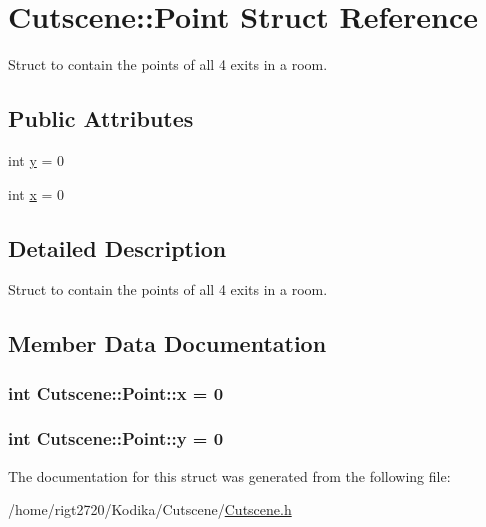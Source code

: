 \hypertarget{structCutscene_1_1Point}{\section{Cutscene\-:\-:Point Struct Reference}
\label{structCutscene_1_1Point}
}


Struct to contain the points of all 4 exits in a room.  


\subsection*{Public Attributes}
\begin{DoxyCompactItemize}
\item 
int \hyperlink{structCutscene_1_1Point_a1b1244ba70a9491ac1e30078fa1294dd}{y} = 0
\item 
int \hyperlink{structCutscene_1_1Point_a0385f9db7adf3f661c42f4bd2a00bad0}{x} = 0
\end{DoxyCompactItemize}


\subsection{Detailed Description}
Struct to contain the points of all 4 exits in a room. 

\subsection{Member Data Documentation}
\hypertarget{structCutscene_1_1Point_a0385f9db7adf3f661c42f4bd2a00bad0}{
\subsubsection[{x}]{\setlength{\rightskip}{0pt plus 5cm}int Cutscene\-::\-Point\-::x = 0}}\label{structCutscene_1_1Point_a0385f9db7adf3f661c42f4bd2a00bad0}
\hypertarget{structCutscene_1_1Point_a1b1244ba70a9491ac1e30078fa1294dd}{
\subsubsection[{y}]{\setlength{\rightskip}{0pt plus 5cm}int Cutscene\-::\-Point\-::y = 0}}\label{structCutscene_1_1Point_a1b1244ba70a9491ac1e30078fa1294dd}


The documentation for this struct was generated from the following file\-:\begin{DoxyCompactItemize}
\item 
/home/rigt2720/\-Kodika/\-Cutscene/\hyperlink{Cutscene_8h}{Cutscene.\-h}\end{DoxyCompactItemize}
